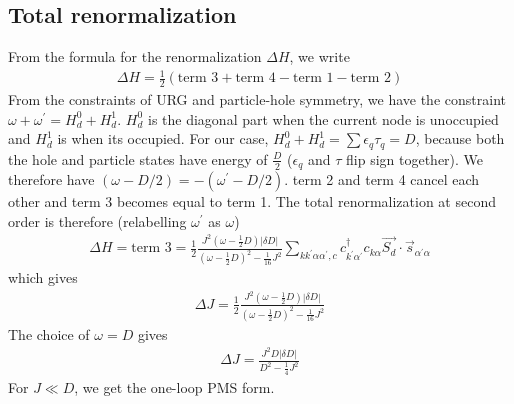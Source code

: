 \documentclass[12pt]{article}
\begin{document}
\subsection{Total renormalization}
From the formula for the renormalization \(\Delta H\), we write
\begin{equation}\begin{aligned}
	\Delta H = \frac{1}{2}\left(\text{term 3} + \text{term 4} - \text{term 1} - \text{term 2}\right)
\end{aligned}\end{equation}
From the constraints of URG and particle-hole symmetry, we have the constraint \(\omega + \omega^\prime = H_d^0 + H_d^1\). \(H_d^0\) is the diagonal part when the current node is unoccupied and \(H_d^1\) is when its occupied. For our case, \(H_d^0 + H_d^1 = \sum \epsilon_q \tau_q = D\), because both the hole and particle states have energy of \(\frac{D}{2}\) (\(\epsilon_q\) and \(\tau\) flip sign together). We therefore have \((\omega - D/2) = -(\omega^\prime - D/2)\). term 2 and term 4 cancel each other and term 3 becomes equal to term 1. The total renormalization at second order is therefore (relabelling \(\omega^\prime\) as \(\omega\))
\begin{equation}\begin{aligned}
	\Delta H = \text{term 3} = \frac{1}{2}\frac{J^2\left(\omega - \frac{1}{2}D\right)|\delta D|}{\left(\omega - \frac{1}{2}D\right)^2 - \frac{1}{16}J^2} \sum_{k k^\prime \alpha \alpha^\prime,c} c^\dagger_{k^\prime\alpha^\prime} c_{k\alpha} \vec{S_d}\cdot\vec{s}_{\alpha^\prime \alpha}
\end{aligned}\end{equation}
which gives
\begin{equation}\begin{aligned}
	\Delta J = \frac{1}{2}\frac{J^2\left(\omega - \frac{1}{2}D\right)|\delta D|}{\left(\omega - \frac{1}{2}D\right)^2 - \frac{1}{16}J^2}
\end{aligned}\end{equation}
The choice of \(\omega = D\) gives
\begin{equation}\begin{aligned}
	\Delta J = \frac{J^2 D |\delta D|}{D^2 - \frac{1}{4}J^2}
\end{aligned}\end{equation}
For \(J \ll D\), we get the one-loop PMS form.
\end{document}
